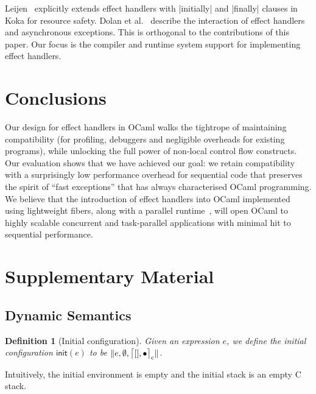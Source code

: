 \documentclass[sigplan,screen]{acmart}
\newtheorem{definition}[theorem]{Definition}
\newcommand{\cstacka}[2]{\big \lceil #1, #2 \big \rceil_{\text c}} %
\newcommand{\configa}[3]{\|#1,#2,#3\|}
\begin{document}
Leijen~\cite{Leijen18} explicitly extends effect handlers with |initially| and
|finally| clauses in Koka for resource safety. Dolan et al.~\cite{TFP17}
describe the interaction of effect handlers and asynchronous exceptions. This
is orthogonal to the contributions of this paper. Our focus is the compiler and
runtime system support for implementing effect handlers.

\section{Conclusions}
\label{sec:conc}

Our design for effect handlers in OCaml walks the tightrope of maintaining
compatibility (for profiling, debuggers and negligible overheads for existing
programs), while unlocking the full power of non-local control flow constructs.
Our evaluation shows that we have achieved our goal: we retain compatibility
with a surprisingly low performance overhead for sequential code that preserves
the spirit of ``fast exceptions'' that has always characterised OCaml
programming. We believe that the introduction of effect handlers into OCaml
implemented using lightweight fibers, along with a parallel
runtime~\cite{Sivaramakrishnan20}, will open OCaml to highly scalable
concurrent and task-parallel applications with minimal hit to sequential
performance.





\clearpage

\section*{Supplementary Material}
\setcounter{figure}{0}

\subsection*{Dynamic Semantics}

\begin{definition}[Initial configuration]
	Given an expression $e$, we define the initial configuration $\textsf{init}(e)$
	to be $\configa{e}{\emptyset}{\cstacka{[]}{\bullet}}$.
\end{definition}

Intuitively, the initial environment is empty and the initial stack is an empty
C stack.
\end{document}
